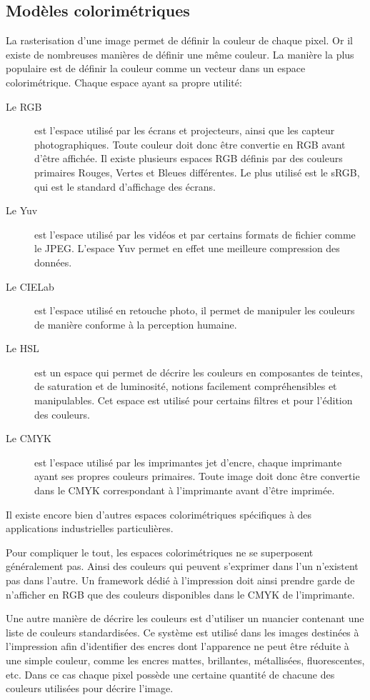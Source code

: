 		\subsection{Modèles colorimétriques}
			La rasterisation d'une image permet de définir la couleur de chaque pixel. Or il existe de nombreuses manières de définir une même couleur.
			La manière la plus populaire est de définir la couleur comme un vecteur dans un espace colorimétrique. Chaque espace ayant sa propre utilité:
			\begin{description}
				\item[Le RGB] est l'espace utilisé par les écrans et projecteurs, ainsi que les capteur photographiques. Toute couleur doit donc être
				convertie en RGB avant d'être affichée. Il existe plusieurs espaces RGB définis par des couleurs primaires Rouges, Vertes et Bleues différentes.
				Le plus utilisé est le sRGB, qui est le standard d'affichage des écrans.
				\item[Le Yuv] est l'espace utilisé par les vidéos et par certains formats de fichier comme le JPEG.
				L'espace Yuv permet en effet une meilleure compression des données.
				\item[Le CIELab] est l'espace utilisé en retouche photo, il permet de manipuler les couleurs de manière conforme à la perception humaine.
				\item[Le HSL] est un espace qui permet de décrire les couleurs en composantes de teintes, de saturation et de luminosité, notions
				facilement compréhensibles et manipulables. Cet espace est utilisé pour certains filtres et pour l'édition des couleurs.
				\item[Le CMYK] est l'espace utilisé par les imprimantes jet d'encre, chaque imprimante ayant ses propres couleurs primaires. 
				Toute image doit donc être convertie dans le CMYK correspondant à l'imprimante avant d'être imprimée.
			\end{description}
			Il existe encore bien d'autres espaces colorimétriques spécifiques à des applications industrielles particulières. 

			Pour compliquer le tout, les espaces colorimétriques ne se superposent généralement pas. Ainsi des couleurs qui peuvent s'exprimer dans l'un n'existent pas
			dans l'autre. Un framework dédié à l'impression doit ainsi prendre garde de n'afficher en RGB que des couleurs disponibles dans le CMYK de l'imprimante.

			Une autre manière de décrire les couleurs est d'utiliser un nuancier contenant une liste de couleurs standardisées. Ce système est utilisé dans les images destinées à l'impression
			afin d'identifier des encres dont l'apparence ne peut être réduite à une simple couleur, comme les encres mattes, brillantes, métallisées,
			fluorescentes, etc. Dans ce cas chaque pixel possède une certaine quantité de chacune des  couleurs utilisées pour décrire l'image.


